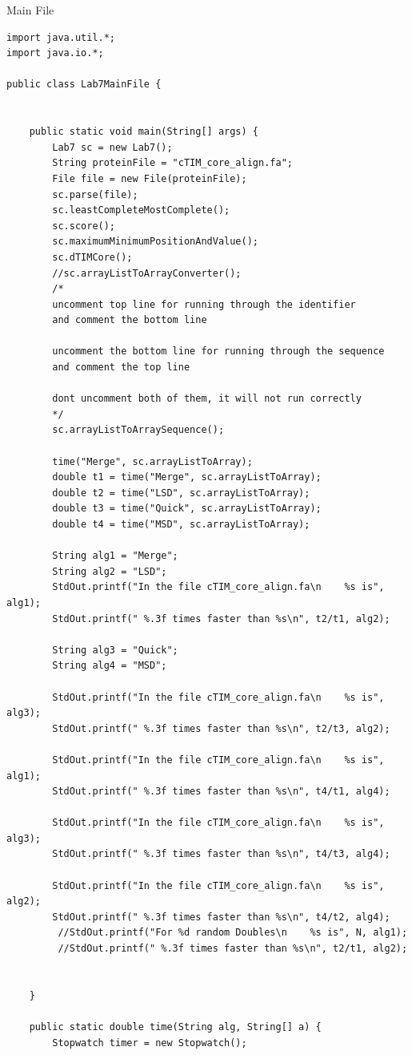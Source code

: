\documentclass{article}
\begin{document}
\begin{center}
Main File
\end{center}
\begin{lstlisting}
import java.util.*;
import java.io.*;

public class Lab7MainFile {


	public static void main(String[] args) {
		Lab7 sc = new Lab7();
		String proteinFile = "cTIM_core_align.fa";
		File file = new File(proteinFile);
		sc.parse(file);
		sc.leastCompleteMostComplete();
		sc.score();
		sc.maximumMinimumPositionAndValue();
		sc.dTIMCore();
		//sc.arrayListToArrayConverter(); 
		/*
		uncomment top line for running through the identifier
		and comment the bottom line

		uncomment the bottom line for running through the sequence 
		and comment the top line

		dont uncomment both of them, it will not run correctly
		*/
		sc.arrayListToArraySequence();
		
		time("Merge", sc.arrayListToArray);
		double t1 = time("Merge", sc.arrayListToArray);
		double t2 = time("LSD", sc.arrayListToArray);
		double t3 = time("Quick", sc.arrayListToArray);
		double t4 = time("MSD", sc.arrayListToArray);

		String alg1 = "Merge";
		String alg2 = "LSD";
        StdOut.printf("In the file cTIM_core_align.fa\n    %s is", alg1);
        StdOut.printf(" %.3f times faster than %s\n", t2/t1, alg2);       

        String alg3 = "Quick";
        String alg4 = "MSD";

 	    StdOut.printf("In the file cTIM_core_align.fa\n    %s is", alg3);
        StdOut.printf(" %.3f times faster than %s\n", t2/t3, alg2); 

        StdOut.printf("In the file cTIM_core_align.fa\n    %s is", alg1);
        StdOut.printf(" %.3f times faster than %s\n", t4/t1, alg4); 

        StdOut.printf("In the file cTIM_core_align.fa\n    %s is", alg3);
        StdOut.printf(" %.3f times faster than %s\n", t4/t3, alg4); 

        StdOut.printf("In the file cTIM_core_align.fa\n    %s is", alg2);
        StdOut.printf(" %.3f times faster than %s\n", t4/t2, alg4); 
         //StdOut.printf("For %d random Doubles\n    %s is", N, alg1);
         //StdOut.printf(" %.3f times faster than %s\n", t2/t1, alg2);       


	}

	public static double time(String alg, String[] a) {
        Stopwatch timer = new Stopwatch();


\end{lstlisting}
\end{document}
